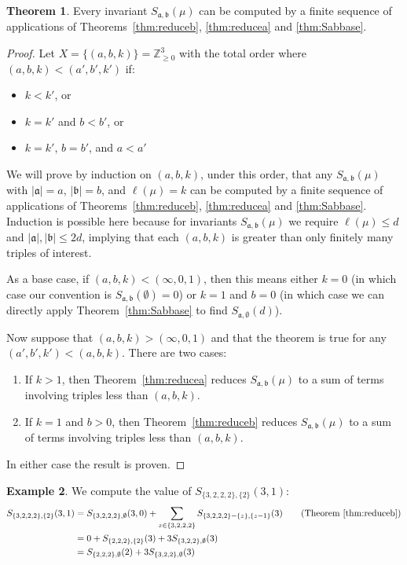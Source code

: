 \documentclass[11pt]{article}           %
\newcommand{\Z}{\ensuremath{\mathbb{Z}}}
\renewcommand{\a}{\mathfrak a}
\renewcommand{\b}{\mathfrak b}
\theoremstyle{definition}
\newtheorem{thm}{Theorem}[section]
\newtheorem{eg}[thm]{Example}
\begin{document}
\begin{thm}
  Every invariant $S_{\a,\b}(\mu)$ can be computed by
  a finite
  sequence of applications of Theorems~\ref{thm:reduceb}, \ref{thm:reducea} and \ref{thm:Sabbase}.
  \end{thm}
\begin{proof}
  Let $X=\{(a,b,k)\}=\Z_{\geq 0}^3$ with the total order where
  $(a,b,k)<(a',b',k')$
  if:
  \begin{itemize}
  \item $k<k'$, or
  \item $k=k'$ and $b<b'$, or
    \item $k=k'$, $b=b'$, and $a<a'$
  \end{itemize}
  We will prove by induction on $(a,b,k)$, under this order, that
  any $S_{\a,\b}(\mu)$ with $|\a|=a$, $|\b|=b$, and $\ell(\mu)=k$
  can be computed by a finite sequence of applications
  of Theorems~\ref{thm:reduceb}, \ref{thm:reducea} and \ref{thm:Sabbase}.
  Induction is possible here because for invariants $S_{\a,\b}(\mu)$
  we require $\ell(\mu)\leq d$ and $|\a|,|\b|\leq 2d$, implying
  that each $(a,b,k)$ is greater than only finitely many triples
  of interest.
  
  As a base case, if $(a,b,k)<(\infty,0,1)$, then
  this means either $k=0$ (in which case
  our convention is $S_{\a,\b}(\emptyset)=0$) or $k=1$ and $b=0$
  (in which case we can directly apply Theorem~\ref{thm:Sabbase} to find
  $S_{\a,\emptyset}(d)$).

  Now suppose that $(a,b,k)>(\infty,0,1)$
  and that the theorem is true for any $(a',b',k')<(a,b,k)$. There are two cases:
  \begin{enumerate}
  \item If $k>1$, then Theorem~\ref{thm:reducea} reduces $S_{\a,\b}(\mu)$ to
    a sum of terms involving triples less than $(a,b,k)$.
  \item If $k=1$ and $b>0$, then Theorem~\ref{thm:reduceb} reduces
    $S_{\a,\b}(\mu)$ to a sum of terms involving triples less than $(a,b,k)$.
  \end{enumerate}
  In either case the result is proven.
\end{proof}

\begin{eg}
  We compute the value of $S_{\{3,2,2,2\},\{2\}}(3,1)$:
  \begin{align*}
    S_{\{3,2,2,2\},\{2\}}(3,1) &= S_{\{3,2,2,2\},\emptyset}(3,0)+\sum_{z\in\{3,2,2,2\}}S_{\{3,2,2,2\}-\{z\},\{z-1\}}(3) \tag*{(Theorem~\ref{thm:reduceb})} \\
    &=0+S_{\{2,2,2\},\{2\}}(3)+3S_{\{3,2,2\},\emptyset}(3) \\
    &=S_{\{2,2,2\},\emptyset}(2)+3S_{\{3,2,2\},\emptyset}(3)
  \end{align*}
\end{eg}
\end{document}
